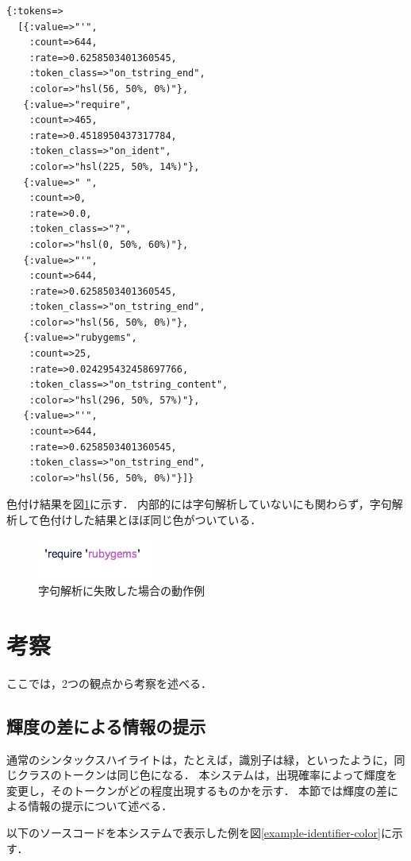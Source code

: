 \documentclass{cs-thesis}
\begin{document}
\begin{framed}
\begin{verbatim}
{:tokens=>
  [{:value=>"'",
    :count=>644,
    :rate=>0.6258503401360545,
    :token_class=>"on_tstring_end",
    :color=>"hsl(56, 50%, 0%)"},
   {:value=>"require",
    :count=>465,
    :rate=>0.4518950437317784,
    :token_class=>"on_ident",
    :color=>"hsl(225, 50%, 14%)"},
   {:value=>" ",
    :count=>0,
    :rate=>0.0,
    :token_class=>"?",
    :color=>"hsl(0, 50%, 60%)"},
   {:value=>"'",
    :count=>644,
    :rate=>0.6258503401360545,
    :token_class=>"on_tstring_end",
    :color=>"hsl(56, 50%, 0%)"},
   {:value=>"rubygems",
    :count=>25,
    :rate=>0.024295432458697766,
    :token_class=>"on_tstring_content",
    :color=>"hsl(296, 50%, 57%)"},
   {:value=>"'",
    :count=>644,
    :rate=>0.6258503401360545,
    :token_class=>"on_tstring_end",
    :color=>"hsl(56, 50%, 0%)"}]}
\end{verbatim}
\end{framed}

色付け結果を図\ref{example-code-can-not-compile}に示す．
内部的には字句解析していないにも関わらず，字句解析して色付けした結果とほぼ同じ色がついている．

  \begin{figure}[htbp]
   \centering
   \includegraphics[scale=0.8]{example-code-can-not-compile.png}
   \caption{字句解析に失敗した場合の動作例}
   \label{example-code-can-not-compile}
  \end{figure}

  \section{考察}
  ここでは，2つの観点から考察を述べる．

  \subsection{輝度の差による情報の提示}

  通常のシンタックスハイライトは，たとえば，識別子は緑，といったように，同じクラスのトークンは同じ色になる．
  本システムは，出現確率によって輝度を変更し，そのトークンがどの程度出現するものかを示す．
  本節では輝度の差による情報の提示について述べる．

  以下のソースコードを本システムで表示した例を図\ref{example-identifier-color}に示す．
\end{document}
